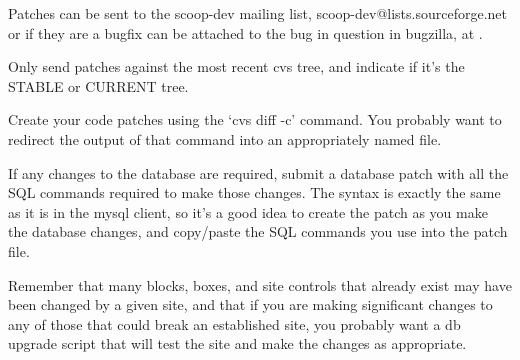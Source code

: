 Patches can be sent to the scoop-dev mailing list, scoop-dev@lists.sourceforge.net or if they are a bugfix can be attached to the bug in question in bugzilla, at .

Only send patches against the most recent cvs tree, and indicate if it's the STABLE or CURRENT tree.

Create your code patches using the `cvs diff -c' command. You probably want to redirect the output of that command into an appropriately named file.

If any changes to the database are required, submit a database patch with all the SQL commands required to make those changes. The syntax is exactly the same as it is in the mysql client, so it's a good idea to create the patch as you make the database changes, and copy/paste the SQL commands you use into the patch file.

Remember that many blocks, boxes, and site controls that already exist may have been changed by a given site, and that if you are making significant changes to any of those that could break an established site, you probably want a db upgrade script that will test the site and make the changes as appropriate.


